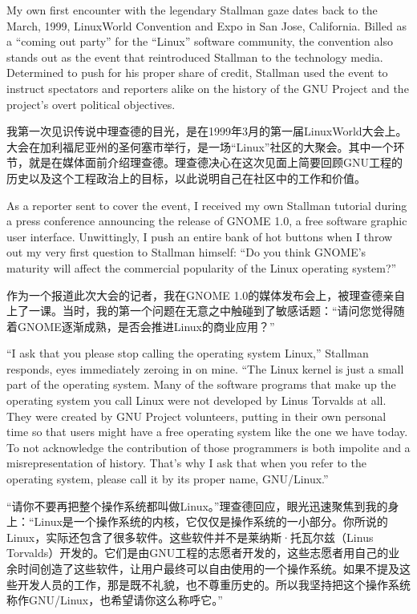 \ifdefined\eng
My own first encounter with the legendary Stallman gaze dates back to the March, 1999, LinuxWorld Convention and Expo in San Jose, California. Billed as a ``coming out party'' for the ``Linux'' software community, the convention also stands out as the event that reintroduced Stallman to the technology media. Determined to push for his proper share of credit, Stallman used the event to instruct spectators and reporters alike on the history of the GNU Project and the project's overt political objectives.
\fi

\ifdefined\chs
我第一次见识传说中理查德的目光，是在1999年3月的第一届LinuxWorld大会上。大会在加利福尼亚州的圣何塞市举行，是一场“Linux”社区的大聚会。其中一个环节，就是在媒体面前介绍理查德。理查德决心在这次见面上简要回顾GNU工程的历史以及这个工程政治上的目标，以此说明自己在社区中的工作和价值。
\fi

\ifdefined\eng
As a reporter sent to cover the event, I received my own Stallman tutorial during a press conference announcing the release of GNOME 1.0, a free software graphic user interface. Unwittingly, I push an entire bank of hot buttons when I throw out my very first question to Stallman himself: ``Do you think GNOME's maturity will affect the commercial popularity of the Linux operating system?''
\fi

\ifdefined\chs
作为一个报道此次大会的记者，我在GNOME 1.0的媒体发布会上，被理查德亲自上了一课。当时，我的第一个问题在无意之中触碰到了敏感话题：“请问您觉得随着GNOME逐渐成熟，是否会推进Linux的商业应用？”
\fi

\ifdefined\eng
``I ask that you please stop calling the operating system Linux,'' Stallman responds, eyes immediately zeroing in on mine. ``The Linux kernel is just a small part of the operating system. Many of the software programs that make up the operating system you call Linux were not developed by Linus Torvalds at all. They were created by GNU Project volunteers, putting in their own personal time so that users might have a free operating system like the one we have today. To not acknowledge the contribution of those programmers is both impolite and a misrepresentation of history. That's why I ask that when you refer to the operating system, please call it by its proper name, GNU/Linux.''
\fi

\ifdefined\chs
“请你不要再把整个操作系统都叫做Linux。”理查德回应，眼光迅速聚焦到我的身上：“Linux是一个操作系统的内核，它仅仅是操作系统的一小部分。你所说的Linux，实际还包含了很多软件。这些软件并不是莱纳斯·托瓦尔兹（Linus Torvalds）开发的。它们是由GNU工程的志愿者开发的，这些志愿者用自己的业余时间创造了这些软件，让用户最终可以自由使用的一个操作系统。如果不提及这些开发人员的工作，那是既不礼貌，也不尊重历史的。所以我坚持把这个操作系统称作GNU/Linux，也希望请你这么称呼它。”
\fi

